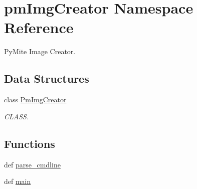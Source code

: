 \hypertarget{namespacepm_img_creator}{\section{pm\-Img\-Creator Namespace Reference}
\label{namespacepm_img_creator}
}


Py\-Mite Image Creator.  


\subsection*{Data Structures}
\begin{DoxyCompactItemize}
\item 
class \hyperlink{classpm_img_creator_1_1_pm_img_creator}{Pm\-Img\-Creator}
\begin{DoxyCompactList}\small\item\em C\-L\-A\-S\-S. \end{DoxyCompactList}\end{DoxyCompactItemize}
\subsection*{Functions}
\begin{DoxyCompactItemize}
\item 
def \hyperlink{namespacepm_img_creator_aa1b31915d9f447b878d5a361274525e2}{parse\-\_\-cmdline}
\item 
def \hyperlink{namespacepm_img_creator_adc5f299be4ae295cdd881bf0ced35dab}{main}
\end{DoxyCompactItemize}
